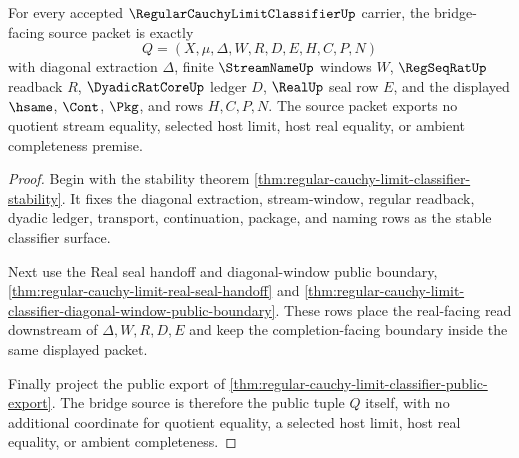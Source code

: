 \begin{theorem}
\label{thm:regular-cauchy-limit-classifier-bridge-source-packet}
For every accepted $\RegularCauchyLimitClassifierUp$ carrier, the bridge-facing source packet is exactly
$$
Q=(X,\mu,\Delta,W,R,D,E,H,C,P,N)
$$
with diagonal extraction $\Delta$, finite $\StreamNameUp$ windows $W$, $\RegSeqRatUp$ readback $R$, $\DyadicRatCoreUp$ ledger $D$, $\RealUp$ seal row $E$, and the displayed $\hsame$, $\Cont$, $\Pkg$, and \NameCert{} rows $H,C,P,N$. The source packet exports no quotient stream equality, selected host limit, host real equality, or ambient completeness premise.
\end{theorem}
\begin{proof}
Begin with the stability theorem \autoref{thm:regular-cauchy-limit-classifier-stability}. It fixes the diagonal extraction, stream-window, regular readback, dyadic ledger, transport, continuation, package, and naming rows as the stable classifier surface.

Next use the Real seal handoff and diagonal-window public boundary, \autoref{thm:regular-cauchy-limit-real-seal-handoff} and \autoref{thm:regular-cauchy-limit-classifier-diagonal-window-public-boundary}. These rows place the real-facing read downstream of $\Delta,W,R,D,E$ and keep the completion-facing boundary inside the same displayed packet.

Finally project the public export of \autoref{thm:regular-cauchy-limit-classifier-public-export}. The bridge source is therefore the public tuple $Q$ itself, with no additional coordinate for quotient equality, a selected host limit, host real equality, or ambient completeness.
\end{proof}

